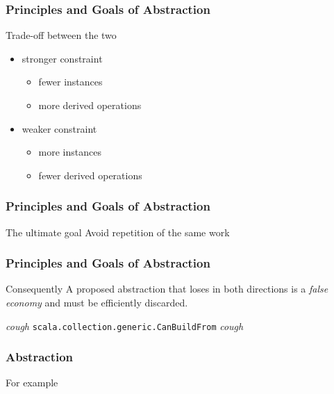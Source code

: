 \begin{frame}
\frametitle{Principles and Goals of Abstraction}
\begin{block}{Trade-off between the two}
\begin{itemize}
  \item stronger constraint
    \begin{itemize}
      \item fewer instances
      \item more derived operations
    \end{itemize}
  \item weaker constraint
    \begin{itemize}
      \item more instances
      \item fewer derived operations
    \end{itemize}
\end{itemize}
\end{block}
\end{frame}


\begin{frame}
\frametitle{Principles and Goals of Abstraction}
\begin{block}{The ultimate goal}
Avoid repetition of the same work
\end{block}
\end{frame}


\begin{frame}
\frametitle{Principles and Goals of Abstraction}
\begin{block}{Consequently}
A proposed abstraction that loses in both directions is a \emph{false economy} and must be efficiently discarded.
\end{block}
\tiny{\emph{cough} \lstinline{scala.collection.generic.CanBuildFrom} \emph{cough}}\normalsize
\end{frame}


\begin{frame}
\frametitle{Abstraction}
\begin{center}
\huge{For example}\normalsize
\end{center}
\end{frame}


